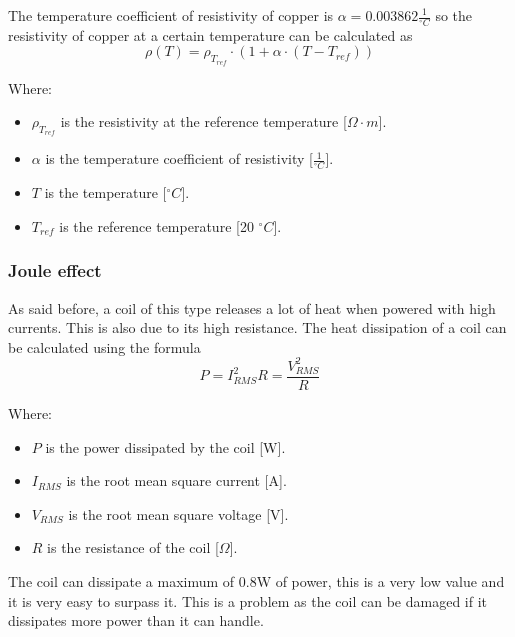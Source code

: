 The temperature coefficient of resistivity of copper is $\alpha = 0.003862 \frac{1}{^{\circ}C}$ so the resistivity of copper at a certain temperature can be calculated as
\begin{equation}
    \rho(T) = \rho_{T_{ref}} \cdot (1 + \alpha \cdot (T - T_{ref}))
\end{equation}
    
Where: 
\begin{itemize}
    \item \( \rho_{T_{ref}} \) is the resistivity at the reference temperature [\(\Omega \cdot m\)].
    \item \( \alpha \) is the temperature coefficient of resistivity [\(\frac{1}{^{\circ}C}\)].
    \item \( T \) is the temperature [\(^{\circ}C\)].
    \item \( T_{ref} \) is the reference temperature [20 \(^{\circ}C\)].
\end{itemize}
    

\subsubsection{Joule effect}
As said before, a coil of this type releases a lot of heat when powered with high currents. This is also due to its high resistance. The heat dissipation of a coil can be calculated using the formula
\begin{equation}
    P = I_{RMS}^2 R = \frac{V_{RMS}^2}{R}
\end{equation}

Where:
\begin{itemize}
    \item \( P \) is the power dissipated by the coil [W].
    \item \( I_{RMS} \) is the root mean square current [A].
    \item \( V_{RMS} \) is the root mean square voltage [V].
    \item \( R \) is the resistance of the coil [\(\Omega\)].
\end{itemize}

The coil can dissipate a maximum of 0.8W of power, this is a very low value and it is very easy to surpass it. This is a problem as the coil can be damaged if it dissipates more power than it can handle.


